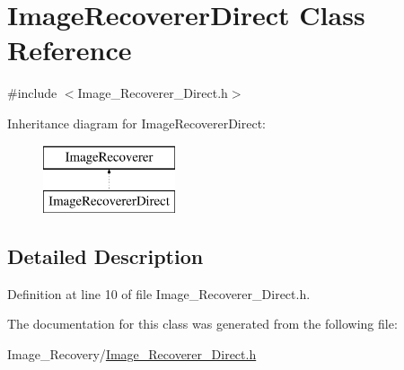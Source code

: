 \hypertarget{class_image_recoverer_direct}{}\section{Image\+Recoverer\+Direct Class Reference}
\label{class_image_recoverer_direct}


{\ttfamily \#include $<$Image\+\_\+\+Recoverer\+\_\+\+Direct.\+h$>$}

Inheritance diagram for Image\+Recoverer\+Direct\+:\begin{figure}[H]
\begin{center}
\leavevmode
\includegraphics[height=2.000000cm]{class_image_recoverer_direct}
\end{center}
\end{figure}


\subsection{Detailed Description}


Definition at line 10 of file Image\+\_\+\+Recoverer\+\_\+\+Direct.\+h.



The documentation for this class was generated from the following file\+:\begin{DoxyCompactItemize}
\item 
Image\+\_\+\+Recovery/\hyperlink{_image___recoverer___direct_8h}{Image\+\_\+\+Recoverer\+\_\+\+Direct.\+h}\end{DoxyCompactItemize}
